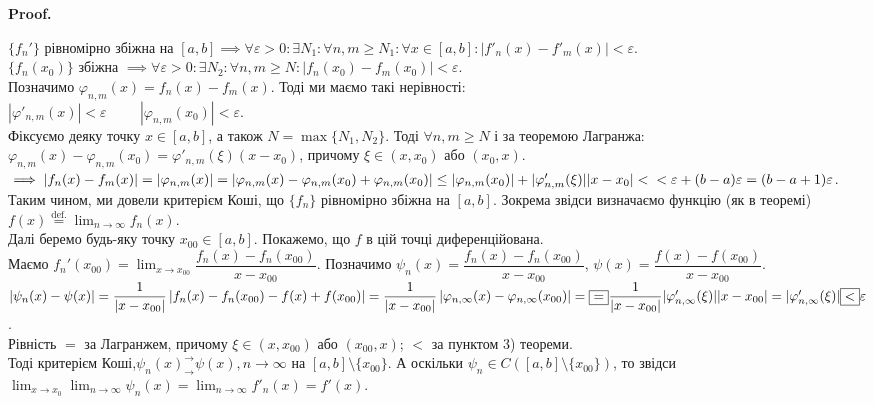 \documentclass[a4paper, 10pt]{article}
\makeatletter
\def\huge{\displaystyle}
\def\qed{$\blacksquare$}
\theoremstyle{theoremdd}
\theoremstyle{theoremdd}
\theoremstyle{theoremdd}
\theoremstyle{theoremdd}
\theoremstyle{theoremdd}
\theoremstyle{theoremdd}
\theoremstyle{theoremdd}
\theoremstyle{theoremdd}
\theoremstyle{theoremdd}
\renewenvironment{proof}[1][Proof.\\]{\par
\pushQED{\hfill \qed}%
\normalfont \topsep6\p@\@plus6\p@\relax
\trivlist
\item\relax
{\bfseries
#1\@addpunct{.}}\hspace\labelsep\ignorespaces
}{%
\popQED\endtrivlist\@endpefalse
}
\makeatother
\begin{document}
\begin{proof}
$\{f_n'\}$ рівномірно збіжна на $[a,b] \implies \forall \varepsilon > 0: \exists N_1: \forall n,m \geq N_1: \forall x \in [a,b]: |f'_n(x) - f'_m(x)| < \varepsilon$.\\
$\{f_n(x_0)\}$ збіжна $\implies \forall \varepsilon > 0: \exists N_2: \forall n,m \geq N: |f_n(x_0) - f_m(x_0)| < \varepsilon$.\\
Позначимо $\varphi_{n,m}(x) = f_n(x) - f_m(x)$. Тоді ми маємо такі нерівності:\\
$|\varphi'_{n,m}(x)| < \varepsilon \hspace{1cm} |\varphi_{n,m}(x_0)| < \varepsilon$.\\
Фіксуємо деяку точку $x \in [a,b]$, а також $N = \max \{ N_1, N_2 \}$. Тоді $\forall n,m \geq N$ і за теоремою Лагранжа: $\varphi_{n,m}(x) - \varphi_{n,m}(x_0) = \varphi'_{n,m}(\xi) (x-x_0)$, причому $\xi \in (x,x_0)$ або $(x_0,x)$.\\
$\implies |f_n(x) - f_m(x)| = |\varphi_{n,m}(x)| = |\varphi_{n,m}(x) - \varphi_{n,m}(x_0) + \varphi_{n,m}(x_0)| \leq |\varphi_{n,m}(x_0)| + |\varphi'_{n,m}(\xi)| |x-x_0| < \\ < \varepsilon + (b-a)\varepsilon = (b-a+1)\varepsilon$.\\
Таким чином, ми довели критерієм Коші, що $\{f_n\}$ рівномірно збіжна на $[a,b]$. Зокрема звідси визначаємо функцію (як в теоремі) $f(x) \overset{\text{def.}}{=} \displaystyle\lim_{n \to \infty} f_n(x)$.
\bigskip \\
Далі беремо будь-яку точку $x_{00} \in [a,b]$. Покажемо, що $f$ в цій точці диференційована.\\
Маємо $f_n'(x_{00}) = \huge\lim_{x \to x_{00}} \dfrac{f_n(x) - f_n(x_{00})}{x-x_{00}}$. Позначимо $\psi_n(x) = \dfrac{f_n(x)-f_n(x_{00})}{x-x_{00}}$, $\psi(x) = \dfrac{f(x)-f(x_{00})}{x-x_{00}}$.\\
$|\psi_n(x) - \psi(x)| = \dfrac{1}{|x-x_{00}|} \left| f_n(x) - f_n(x_{00}) - f(x) + f(x_{00}) \right| = \dfrac{1}{|x-x_{00}|} \left| \varphi_{n,\infty}(x) - \varphi_{n,\infty}(x_{00}) \right| = \\ \boxed{=} \dfrac{1}{|x-x_{00}|} |\varphi_{n,\infty}'(\xi)| |x-x_{00}| = |\varphi_{n,\infty}'(\xi)| \boxed{<} \varepsilon$.\\
\iffalse
$|\psi_n(x) - \psi_m(x)| = \dfrac{1}{|x-x_{00}|} \left| f_n(x) - f_n(x_{00}) - f_m(x) + f_m(x_{00}) \right| = \dfrac{1}{|x-x_{00}|} \left| \varphi_{n,m}(x) - \varphi_{n,m}(x_{00}) \right| = \\ \boxed{=} \dfrac{1}{|x-x_{00}|} |\varphi_{n,m}'(\xi)| |x-x_{00}| = |\varphi_{n,m}'(\xi)| \boxed{<} \varepsilon$
\\
\fi
Рівність $\boxed{=}$ за Лагранжем, причому $\xi \in (x,x_{00})$ або $(x_{00},x)$; $\boxed{<}$ за пунктом 3) теореми.\\
Тоді  критерієм Коші,\fi $\psi_n(x)^\rightarrow_\rightarrow \psi(x), n \to \infty$ на $[a,b] \setminus \{x_{00}\}$. А оскільки $\psi_n \in C([a,b] \setminus \{x_{00}\})$, то звідси \\
 $\huge \lim_{x \to x_0} \lim_{n \to \infty} \psi_n(x) = \lim_{n \to \infty} f'_n(x) = f'(x)$.
\end{proof}
\end{document}
